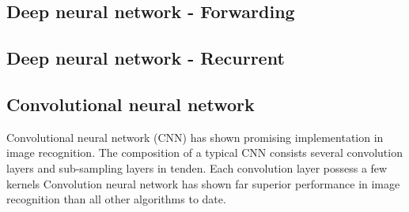 \subsection{Deep neural network - Forwarding}
\subsection{Deep neural network - Recurrent}
\subsection{Convolutional neural network}
Convolutional neural network (CNN) has shown promising implementation in image recognition. The composition of a typical CNN consists several convolution layers and sub-sampling layers in tenden. Each convolution layer possess a few kernels
Convolution neural network has shown far superior performance in image recognition than all other algorithms to date.~\cite{Szegedy_2015}